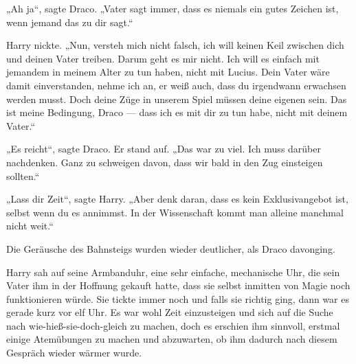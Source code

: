 „Ah ja“, sagte Draco.
„Vater sagt immer, dass es niemals ein gutes Zeichen ist, wenn jemand das zu dir sagt.“

Harry nickte.
„Nun, versteh mich nicht falsch, ich will keinen Keil zwischen dich und deinen Vater treiben. Darum geht es mir nicht. Ich will es einfach mit jemandem in meinem Alter zu tun haben, nicht mit Lucius. Dein Vater wäre damit einverstanden, nehme ich an, er weiß auch, dass du irgendwann erwachsen werden musst. Doch deine Züge in unserem Spiel müssen deine eigenen sein. Das ist meine Bedingung, Draco — dass ich es mit dir zu tun habe, nicht mit deinem Vater.“

„Es reicht“, sagte Draco. Er stand auf.
„Das war zu viel. Ich muss darüber nachdenken. Ganz zu schweigen davon, dass wir bald in den Zug einsteigen sollten.“

„Lass dir Zeit“, sagte Harry.
„Aber denk daran, dass es kein Exklusivangebot ist, selbst wenn du es annimmst. In der Wissenschaft kommt man alleine manchmal nicht weit.“

Die Geräusche des Bahnsteigs wurden wieder deutlicher, als Draco davonging.

Harry sah auf seine Armbanduhr, eine sehr einfache, mechanische Uhr, die sein Vater ihm in der Hoffnung gekauft hatte, dass sie selbst inmitten von Magie noch funktionieren würde. Sie tickte immer noch und falls sie richtig ging, dann war es gerade kurz vor elf Uhr. Es war wohl Zeit einzusteigen und sich auf die Suche nach wie-hieß-sie-doch-gleich zu machen, doch es erschien ihm sinnvoll, erstmal einige Atemübungen zu machen und abzuwarten, ob ihm dadurch nach diesem Gespräch wieder wärmer wurde.


